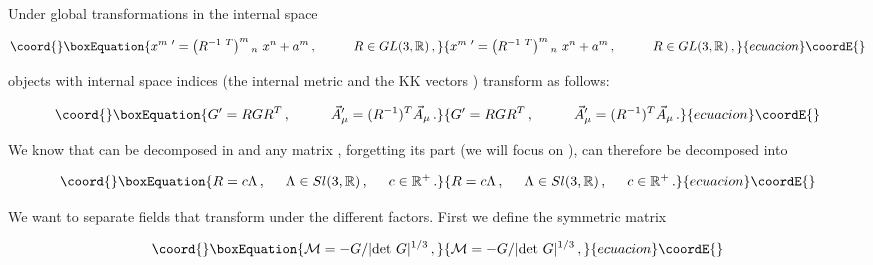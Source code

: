 \documentclass[12pt,a4paper]{article}
\begin{document}
\noindent Under global transformations in the internal space

\begin{equation}\coord{}\boxEquation{
x^{m\ \prime} = \left(R^{-1\ T}\right)^{m}{}_{n}\ x^{n} +a^{m}\, ,
\hspace{1cm}
R\in GL(3,\mathbb{R})\, ,
}{
x^{m\ \prime} = \left(R^{-1\ T}\right)^{m}{}_{n}\ x^{n} +a^{m}\, ,
\hspace{1cm}
R\in GL(3,\mathbb{R})\, ,
}{ecuacion}\coordE{}\end{equation}

\noindent objects with internal space indices 
(the internal metric \coordHE{} and the KK vectors
\coordHE{}) transform as follows:

\begin{equation}\coord{}\boxEquation{
G^{\prime}= RGR^{T}\, ,  
\hspace{1cm}
\vec{A}^{\prime}_{\mu} = (R^{-1})^{T} \vec{A}_{\mu}\, .
}{
G^{\prime}= RGR^{T}\, ,  
\hspace{1cm}
\vec{A}^{\prime}_{\mu} = (R^{-1})^{T} \vec{A}_{\mu}\, .
}{ecuacion}\coordE{}\end{equation}

\noindent We know that \coordHE{} can be decomposed in
\coordHE{} and any
matrix \coordHE{}, forgetting its \coordHE{} part
(we will focus on \coordHE{}), can therefore be
decomposed into

\begin{equation}\coord{}\boxEquation{
R= c\Lambda \, ,
\hspace{.5cm}
\Lambda \in Sl(3,\mathbb{R})\, ,
\hspace{.5cm}
c\in \mathbb{R}^{+}\, .
}{
R= c\Lambda \, ,
\hspace{.5cm}
\Lambda \in Sl(3,\mathbb{R})\, ,
\hspace{.5cm}
c\in \mathbb{R}^{+}\, .
}{ecuacion}\coordE{}\end{equation}

\noindent We want to separate fields that transform under the 
different factors.  First we define the symmetric \coordHE{}
matrix

\begin{equation}\coord{}\boxEquation{
{\cal M} = -G/| {\rm det}\ G |^{1/3}\, ,
\label{eq:defM}}{
{\cal M} = -G/| {\rm det}\ G |^{1/3}\, ,
}{ecuacion}\coordE{}\end{equation}
\end{document}
